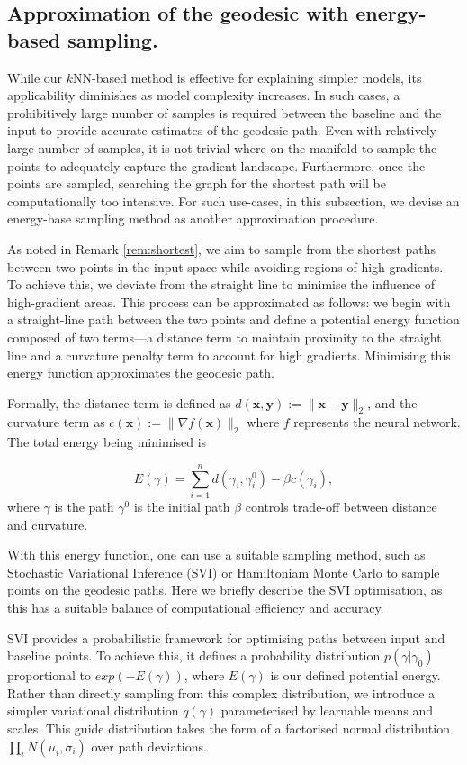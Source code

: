\subsection{Approximation of the geodesic with energy-based sampling.}
While our $k$NN-based method is effective for explaining simpler models, its applicability diminishes as model complexity increases. In such cases, a prohibitively large number of samples is required between the baseline and the input to provide accurate estimates of the geodesic path. Even with relatively large number of samples, it is not trivial where on the manifold to sample the points to adequately capture the gradient landscape. Furthermore, once the points are sampled, searching the graph for the shortest path will be computationally too intensive. For such use-cases, in this subsection, we devise an energy-base sampling method as another approximation procedure.

As noted in Remark \ref{rem:shortest}, we aim to sample from the shortest paths between two points in the input space while avoiding regions of high gradients. To achieve this, we deviate from the straight line to minimise the influence of high-gradient areas. This process can be approximated as follows: we begin with a straight-line path between the two points and define a potential energy function composed of two terms—a distance term to maintain proximity to the straight line and a curvature penalty term to account for high gradients. Minimising this energy function approximates the geodesic path.

Formally, the distance term is defined as $d(\textbf{x},\textbf{y}) := \|\textbf{x}-\textbf{y}\|_2$, and the curvature term as $c(\textbf{x}):=\|\nabla f(\textbf{x})\|_2$ where $f$ represents the neural network. The total energy being minimised is

\begin{equation}
E(\gamma) = \sum_{i=1}^{n} d(\gamma_i, \gamma^0_i) - \beta c(\gamma_i), 
\end{equation}
where $\gamma$ is the path $\gamma^0$ is the initial path $\beta$ controls trade-off between distance and curvature.

With this energy function, one can use a suitable sampling method, such as Stochastic Variational Inference (SVI) or Hamiltoniam Monte Carlo to sample points on the geodesic paths. Here we briefly describe the SVI optimisation, as this has a suitable balance of computational efficiency and accuracy.

SVI provides a probabilistic framework for optimising paths between input and baseline points. To achieve this, it defines a probability distribution $p(\gamma|\gamma_0)$ proportional to $exp(-E(\gamma))$, where $E(\gamma)$ is our defined potential energy. Rather than directly sampling from this complex distribution, we introduce a simpler variational distribution $q(\gamma)$ parameterised by learnable means and scales. This guide distribution takes the form of a factorised normal distribution $\prod_i N(\mu_i,\sigma_i)$ over path deviations.

